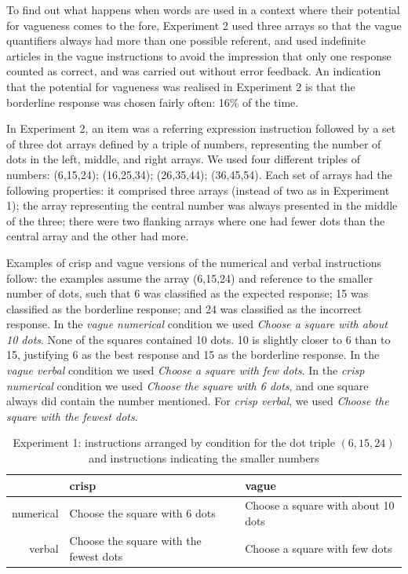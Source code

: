 \documentclass[%
man,		%
floatsintext,%
apacite%
]{apa6}
\begin{document}
To find out what happens when words are used in a context where their potential for vagueness comes to the fore,
Experiment 2 used three arrays so that the vague quantifiers always had more than one possible referent, and used indefinite articles in the vague instructions to avoid the impression that only one response counted as correct, and was carried out without error feedback.
An indication that the potential for vagueness was realised in Experiment 2 is that the borderline response was chosen fairly often: 16\% of the time.

In Experiment 2, an item was a referring expression instruction followed by a set of three dot arrays defined by a triple of numbers, representing the number of dots in the left, middle, and right arrays. We used four different triples of numbers: (6,15,24); (16,25,34); (26,35,44); (36,45,54). Each set of arrays had the following properties: it comprised three arrays (instead of two as in Experiment 1); the array representing the central number was always presented in the middle of the three; there were two flanking arrays where one had fewer dots than the central array and the other had more.

Examples of crisp and vague versions of the numerical and verbal instructions follow: the examples assume the array (6,15,24) and reference to the smaller number of dots, such that 6 was classified as the expected response; 15 was classified as the borderline response; and 24 was classified as the incorrect response. In the {\em vague numerical} condition we used \emph{Choose a square with about 10 dots}. None of the squares contained 10 dots. 10 is slightly closer to 6 than to 15, justifying 6 as the best response and 15 as the borderline response. In the {\em vague verbal} condition we used \emph{Choose a square with few dots}. In the {\em crisp numerical} condition we used \emph{Choose the square with 6 dots}, and one square always did contain the number mentioned. For {\em crisp verbal}, we used \emph{Choose the square with the fewest dots}.


\begin{table}[htbp]
\caption{Experiment 1: instructions arranged by condition for the dot triple $(6,15,24)$ and instructions indicating the smaller numbers}
\label{instre3}
\begin{tabular}{rll}
&crisp&vague\\
\midrule
numerical	&	Choose the square with 6 dots 			& 	Choose a square with about 10 dots	\\
verbal	&	Choose the square with the fewest dots	&	Choose a square with few dots		\\
\midrule
\end{tabular}
\end{table}
\end{document}
